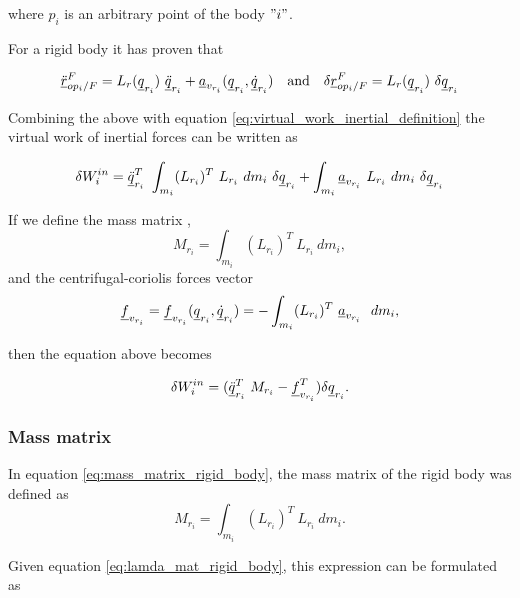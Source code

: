where $p_i$ is an arbitrary point of the body $"i"$.

For a rigid body it has proven that 

\[
    \pvec{\ddot{r}}{op_{i}}{F}{F} = L_{r}(\vecd{q}_{r_{i}}) \ 
    \vecd{\ddot{q}}_{r_{i}} + \vecd{a}_{v_{r_i}}(\vecd{q}_{r_{i}}, 
    \vecd{\dot{q}}_{r_{i}}) \quad \text{and} \quad \delta \pvec{r}{op_{i}}{F}{F} 
    = L_{r}(\vecd{q}_{r_{i}})\ \delta\vecd{q}_{r_{i}}
\]

Combining the above with equation \eqref{eq:virtual_work_inertial_definition} 
the virtual work of inertial forces can be written as 

\[
    \delta W^{in}_{i} = 
    \vecd{\ddot{q}}_{r_{i}}^{T}\ \int_{m_i} (L_{r_i})^{T} \ L_{r_i}\ dm_{i}\ \delta\vecd{q}_{r_{i}} 
    + \int_{m_i} \vecd{a}_{v_{r_i}}\ L_{r_i}\ dm_{i}\ \delta\vecd{q}_{r_{i}} 
\]

If we define the mass matrix ,
\begin{equation}
    M_{r_i} = \int_{m_i} (L_{r_i})^{T} \ L_{r_i}\ dm_{i},
    \label{eq:mass_matrix_rigid_body}
\end{equation}
and the centrifugal-coriolis forces vector
\begin{equation}
    \vecd{f}_{v_{r_i}} = \vecd{f}_{v_{r_i}}(\vecd{q}_{r_{i}}, 
    \vecd{\dot{q}}_{r_{i}}) = - \int_{m_i} (L_{r_i})^{T} \ \vecd{a}_{v_{r_i}}\ 
    \ dm_{i},
    \label{eq:coriolis_forces_rigid_body}
\end{equation}

then the equation above becomes

\begin{equation}
    \delta W^{in}_{i} = (\underline{\ddot{q}}_{r_{i}}^{T}\ M_{r_i}  
    - \underline{f}_{v_{r_i}}^{T})\delta\underline{q}_{r_{i}}.
    \label{eq:virtual_inertial_work_rigid_body}
 \end{equation}



\subsubsection{Mass matrix}
In equation \eqref{eq:mass_matrix_rigid_body}, the mass matrix of the rigid 
body was defined as 
\[
    M_{r_i} = \int_{m_i} (L_{r_i})^{T} \ L_{r_i}\ dm_{i}.
\]   

Given equation \eqref{eq:lamda_mat_rigid_body}, this expression can be 
formulated as 

